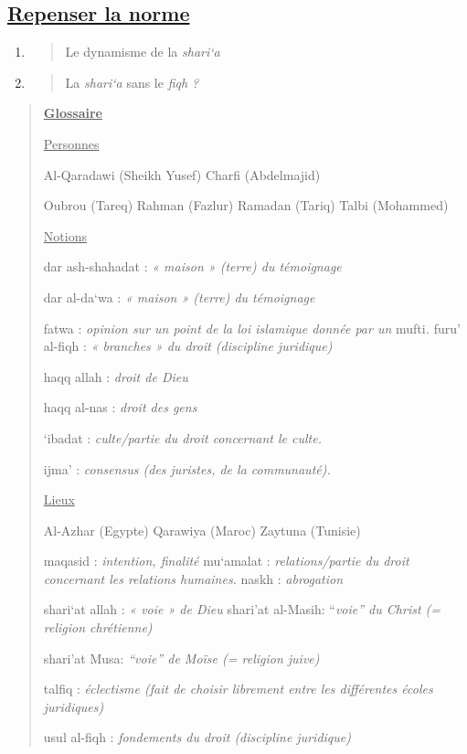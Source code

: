 \begin{enumerate}
{  \subsection{\texorpdfstring{\underline{Repenser la
  norme}}{Repenser la norme}}\label{repenser-la-norme}}

  \begin{enumerate}
  \def\labelenumii{\arabic{enumii}.}
  \item
    \begin{quote}
    Le dynamisme de la \emph{shari`a}
    \end{quote}
  \item
    \begin{quote}
    La \emph{shari`a} sans le \emph{fiqh ?}
    \end{quote}
  \end{enumerate}
\end{enumerate}

\begin{quote}
\textbf{\underline{Glossaire}}

\underline{Personnes}

Al-Qaradawi (Sheikh Yusef) Charfi (Abdelmajid)

Oubrou (Tareq) Rahman (Fazlur) Ramadan (Tariq) Talbi (Mohammed)

\underline{Notions}

dar ash-shahadat : \emph{« maison » (terre) du témoignage}

dar al-da`wa : \emph{« maison » (terre) du témoignage}

fatwa : \emph{opinion sur un point de la loi islamique donnée par un}
mufti\emph{.} furu' al-fiqh : \emph{« branches » du droit (discipline
juridique)}

haqq allah : \emph{droit de Dieu}

haqq al-nas : \emph{droit des gens}

`ibadat : \emph{culte/partie du droit concernant le culte.}

ijma' : \emph{consensus (des juristes, de la communauté).}

\underline{Lieux}

Al-Azhar (Egypte) Qarawiya (Maroc) Zaytuna (Tunisie)

maqasid : \emph{intention, finalité} mu`amalat : \emph{relations/partie
du droit concernant les relations humaines.} naskh : \emph{abrogation}

shari`at allah : \emph{« voie » de Dieu} shari'at al-Masih:
``\emph{voie'' du Christ (= religion chrétienne)}

shari'at Musa: \emph{``voie'' de Moïse (= religion juive)}

talfiq : \emph{éclectisme (fait de choisir librement entre les
différentes écoles juridiques)}

usul al-fiqh : \emph{fondements du droit (discipline juridique)}
\end{quote}


